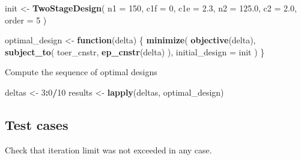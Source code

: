\documentclass[]{book}
\newenvironment{Shaded}{\begin{snugshade}}{\end{snugshade}}
\newcommand{\ControlFlowTok}[1]{\textcolor[rgb]{0.13,0.29,0.53}{\textbf{#1}}}
\newcommand{\DataTypeTok}[1]{\textcolor[rgb]{0.13,0.29,0.53}{#1}}
\newcommand{\DecValTok}[1]{\textcolor[rgb]{0.00,0.00,0.81}{#1}}
\newcommand{\FloatTok}[1]{\textcolor[rgb]{0.00,0.00,0.81}{#1}}
\newcommand{\KeywordTok}[1]{\textcolor[rgb]{0.13,0.29,0.53}{\textbf{#1}}}
\newcommand{\NormalTok}[1]{#1}
\newcommand{\OperatorTok}[1]{\textcolor[rgb]{0.81,0.36,0.00}{\textbf{#1}}}
\newcommand{\StringTok}[1]{\textcolor[rgb]{0.31,0.60,0.02}{#1}}
\begin{document}
\begin{Shaded}
\begin{Highlighting}[]
\NormalTok{init <-}\StringTok{ }\KeywordTok{TwoStageDesign}\NormalTok{(}
    \DataTypeTok{n1    =} \DecValTok{150}\NormalTok{,}
    \DataTypeTok{c1f   =} \DecValTok{0}\NormalTok{,}
    \DataTypeTok{c1e   =} \FloatTok{2.3}\NormalTok{,}
    \DataTypeTok{n2    =} \FloatTok{125.0}\NormalTok{,}
    \DataTypeTok{c2    =} \FloatTok{2.0}\NormalTok{,}
    \DataTypeTok{order =} \DecValTok{5}
\NormalTok{)}

\NormalTok{optimal_design <-}\StringTok{ }\ControlFlowTok{function}\NormalTok{(delta) \{}
    \KeywordTok{minimize}\NormalTok{(}
        \KeywordTok{objective}\NormalTok{(delta),}
        \KeywordTok{subject_to}\NormalTok{(}
\NormalTok{            toer_cnstr,}
            \KeywordTok{ep_cnstr}\NormalTok{(delta)}
\NormalTok{        ),}
        \DataTypeTok{initial_design =}\NormalTok{ init}
\NormalTok{    )}
\NormalTok{\}}
\end{Highlighting}
\end{Shaded}

Compute the sequence of optimal designs

\begin{Shaded}
\begin{Highlighting}[]
\NormalTok{deltas  <-}\StringTok{ }\DecValTok{3}\OperatorTok{:}\DecValTok{0}\OperatorTok{/}\DecValTok{10}
\NormalTok{results <-}\StringTok{ }\KeywordTok{lapply}\NormalTok{(deltas, optimal_design)}
\end{Highlighting}
\end{Shaded}

\hypertarget{test-cases-6}{%
\subsection{Test cases}\label{test-cases-6}}

Check that iteration limit was not exceeded in any case.

\begin{Shaded}
\end{Shaded}
\end{document}
